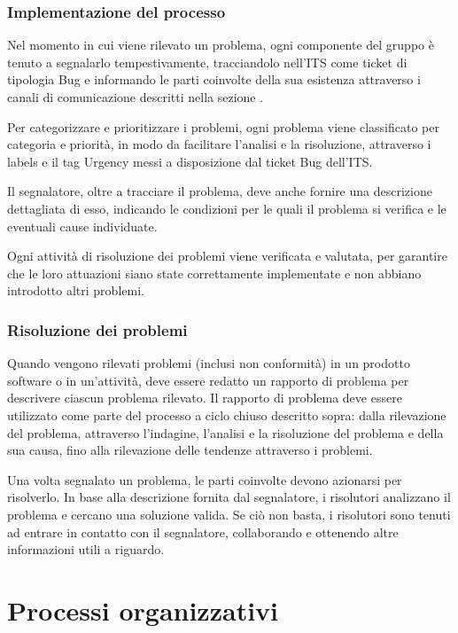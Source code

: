\documentclass[10pt, a4paper]{article}
\begin{document}
\subsubsection{Implementazione del processo}
Nel momento in cui viene rilevato un problema, ogni componente del gruppo è tenuto a segnalarlo tempestivamente, tracciandolo nell'ITS come ticket di tipologia Bug e informando le parti coinvolte della sua esistenza attraverso i canali di comunicazione descritti nella sezione .

Per categorizzare e prioritizzare i problemi, ogni problema viene classificato per categoria e priorità, in modo da facilitare l'analisi e la risoluzione, attraverso i labels e il tag Urgency messi a disposizione dal ticket Bug dell'ITS.

Il segnalatore, oltre a tracciare il problema, deve anche fornire una descrizione dettagliata di esso, indicando le condizioni per le quali il problema si verifica e le eventuali cause individuate.

Ogni attività di risoluzione dei problemi viene verificata e valutata, per garantire che le loro attuazioni siano state correttamente implementate e non abbiano introdotto altri problemi.

\subsubsection{Risoluzione dei problemi}
Quando vengono rilevati problemi (inclusi non conformità) in un prodotto software o in un'attività, deve essere redatto un rapporto di problema per descrivere ciascun problema rilevato. Il rapporto di problema deve essere utilizzato come parte del processo a ciclo chiuso descritto sopra: dalla rilevazione del problema, attraverso l'indagine, l'analisi e la risoluzione del problema e della sua causa, fino alla rilevazione delle tendenze attraverso i problemi.

Una volta segnalato un problema, le parti coinvolte devono azionarsi per risolverlo.
In base alla descrizione fornita dal segnalatore, i risolutori analizzano il problema e cercano una soluzione valida.
Se ciò non basta, i risolutori sono tenuti ad entrare in contatto con il segnalatore, collaborando e ottenendo altre informazioni utili a riguardo.

\newpage

\section{Processi organizzativi}
\end{document}
